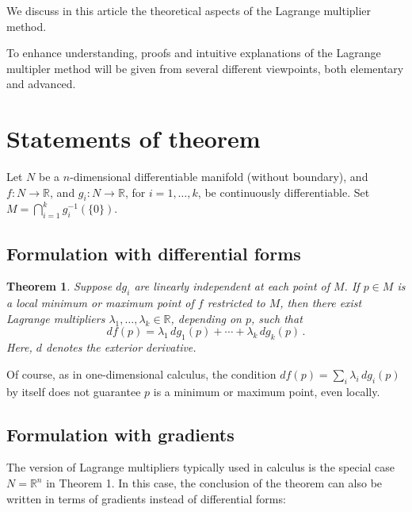 \documentclass[12pt]{article}
\newcommand{\real}{\mathbb{R}}
\newtheorem{thm}{Theorem}
\begin{document}

We discuss in this article the theoretical aspects of 
the Lagrange multiplier method.

To enhance understanding,
proofs and intuitive explanations of the Lagrange multipler method
will be given from several different viewpoints,
both elementary and advanced.

\tableofcontents

\section{Statements of theorem}

Let $N$ be a $n$-dimensional differentiable manifold (without boundary), and $f \colon N \to \real$, and
$g_i \colon N \to \real$, for $i = 1, \dotsc, k$, be continuously differentiable.
Set $M = \bigcap_{i=1}^k g_i^{-1}(\{ 0 \})$.  

\subsection{Formulation with differential forms}
\begin{thm}
Suppose $dg_i$ are linearly independent 
at each point of $M$.
If $p \in M$ is a local minimum or maximum point of $f$ restricted to $M$,
then there exist Lagrange multipliers
 $\lambda_1, \dotsc, \lambda_k \in \real$, depending on $p$,
such that
\[
d f(p) = \lambda_1 \, d g_1(p) + \dotsb + \lambda_k \, d g_k(p)\,.
\]
Here, $d$ denotes the exterior derivative.
\end{thm}

Of course, as in one-dimensional calculus, the condition $d f(p) = 
\sum_i \lambda_i \, d g_i(p)$ by itself does not guarantee $p$ is a 
minimum or maximum point, even locally.


\subsection{Formulation with gradients}

The version of Lagrange multipliers typically 
used in calculus is the special case 
$N = \real^n$ in Theorem 1. 
In this case, 
the conclusion of the 
theorem can also be written 
in terms of gradients instead of differential forms:
\end{document}
